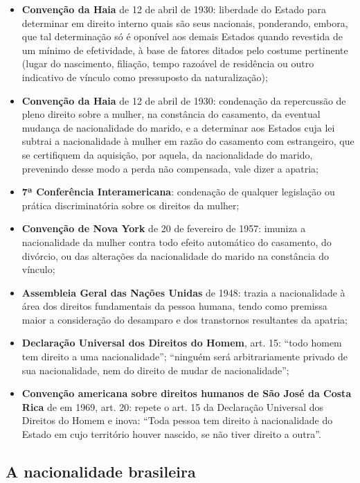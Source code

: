 \documentclass{article}
\begin{document}
\begin{itemize}
    \item \textbf{Convenção da Haia} de 12 de abril de 1930: liberdade do Estado para determinar em direito interno quais são seus nacionais, ponderando, embora, que tal determinação só é oponível aos demais Estados quando revestida de um mínimo de efetividade, à base de fatores ditados pelo costume pertinente (lugar do nascimento, filiação, tempo razoá­vel de residência ou outro indicativo de vínculo como pressuposto da naturalização);
    \item \textbf{Convenção da Haia} de 12 de abril de 1930: condenação da repercussão de pleno direito sobre a mulher, na constância do casamento, da eventual mudança de nacionalidade do marido, e a determinar aos Estados cuja lei subtrai a nacionalidade à mulher em razão do casamento com estrangeiro, que se certifiquem da aquisição, por aquela, da nacionalidade do marido, prevenindo desse modo a perda não compensada, vale dizer a apatria;
    \item \textbf{7ª Conferência Interamericana}: condenação de qualquer legislação ou prática discriminatória sobre os direitos da mulher;
    \item \textbf{Convenção de Nova York} de 20 de fevereiro de 1957: imuniza a nacionalidade da mulher contra todo efeito automático do casamento, do divórcio, ou das alterações da nacionalidade do marido na constância do vínculo;
    \item \textbf{Assembleia Geral das Nações Unidas} de 1948: trazia a nacionalidade à área dos direitos funda­mentais da pessoa humana, tendo como premissa maior a consideração do desamparo e dos transtornos resultantes da apatria;
    \item \textbf{Declaração Universal dos Direitos do Homem}, art. 15: ``todo homem tem direito a uma nacionalidade”; ``ninguém será arbitrariamente privado de sua nacionalidade, nem do direito de mudar de nacionalidade”;
    \item \textbf{Convenção americana sobre direitos humanos de São José da Costa Rica} de em 1969, art. 20: repete o art. 15 da Declaração Universal dos Direitos do Homem e inova: ``Toda pessoa tem direito à nacionalidade do Estado em cujo território houver nascido, se não tiver direito a outra”.
\end{itemize}

\subsection{A nacionalidade brasileira}
\end{document}

